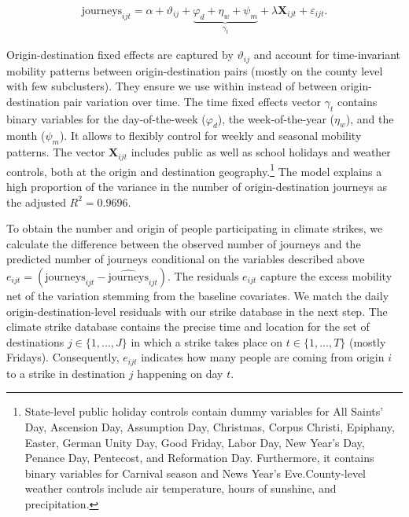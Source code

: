 \begin{align}
\text{journeys}_{ijt} = \alpha + \vartheta_{ij} + \underbrace{\varphi_d+\eta_w+\psi_m}_{\gamma_t} + \lambda \mathbf{X}_{ijt}  + \varepsilon_{ijt}. \label{eq_greta_cons:res_journeys}
\end{align}

Origin-destination fixed effects are captured by $\vartheta_{ij}$ and account for time-invariant mobility patterns between origin-destination pairs (mostly on the county level with few subclusters). They ensure we use within instead of between origin-destination pair variation over time. The time fixed effects vector $\gamma_t$ contains binary variables for the day-of-the-week ($\varphi_d$), the week-of-the-year ($\eta_w$), and the month ($\psi_m$). It allows to flexibly control for weekly and seasonal mobility patterns. The vector $\mathbf{X}_{ijt} $ includes public as well as school holidays and weather controls, both at the origin and destination geography.\footnote{State-level public holiday controls contain dummy variables for All Saints' Day, Ascension Day, Assumption Day, Christmas, Corpus Christi, Epiphany, Easter, German Unity Day, Good Friday, Labor Day, New Year's Day, Penance Day, Pentecost, and Reformation Day. Furthermore, it contains binary variables for Carnival season and News Year's Eve.\newline County-level weather controls include air temperature, hours of sunshine, and precipitation.} The model explains a high proportion of the variance in the number of origin-destination journeys as the adjusted $R^2=0.9696$.


To obtain the number and origin of people participating in climate strikes, we calculate the difference between the observed number of journeys and the predicted number of journeys conditional on the variables described above $e_{ijt} =(\text{journeys}_{ijt} - \widehat{\text{journeys}}_{ijt})$. The residuals $e_{ijt}$ capture the excess mobility net of the variation stemming from the baseline covariates. We match the daily origin-destination-level residuals with our strike database in the next step. The climate strike database contains the precise time and location for the set of destinations $j\in\{1,...,J\}$ in which a strike takes place on $t\in\{1,...,T\}$ (mostly Fridays). Consequently, $e_{ijt}$ indicates how many people are coming from origin $i$ to a strike in destination $j$ happening on day $t$. 


